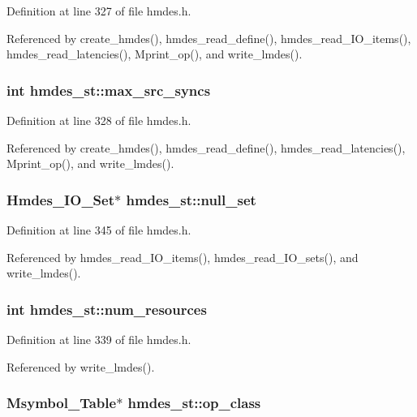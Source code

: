 Definition at line 327 of file hmdes.h.

Referenced by create\_\-hmdes(), hmdes\_\-read\_\-define(), hmdes\_\-read\_\-IO\_\-items(), hmdes\_\-read\_\-latencies(), Mprint\_\-op(), and write\_\-lmdes().
\subsubsection{\setlength{\rightskip}{0pt plus 5cm}int \bf{hmdes\_\-st::max\_\-src\_\-syncs}}\label{structhmdes__st_cdee5e7de7c4d871114a3983232d9766}




Definition at line 328 of file hmdes.h.

Referenced by create\_\-hmdes(), hmdes\_\-read\_\-define(), hmdes\_\-read\_\-latencies(), Mprint\_\-op(), and write\_\-lmdes().
\subsubsection{\setlength{\rightskip}{0pt plus 5cm}\bf{Hmdes\_\-IO\_\-Set}$\ast$ \bf{hmdes\_\-st::null\_\-set}}\label{structhmdes__st_253c976a4e6426574a889e72c77f73fd}




Definition at line 345 of file hmdes.h.

Referenced by hmdes\_\-read\_\-IO\_\-items(), hmdes\_\-read\_\-IO\_\-sets(), and write\_\-lmdes().
\subsubsection{\setlength{\rightskip}{0pt plus 5cm}int \bf{hmdes\_\-st::num\_\-resources}}\label{structhmdes__st_fa908f78fee9f43db0bb28a4b186b4c8}




Definition at line 339 of file hmdes.h.

Referenced by write\_\-lmdes().
\subsubsection{\setlength{\rightskip}{0pt plus 5cm}\bf{Msymbol\_\-Table}$\ast$ \bf{hmdes\_\-st::op\_\-class}}\label{structhmdes__st_091b0d028acff626415238cf2ba93cf9}




